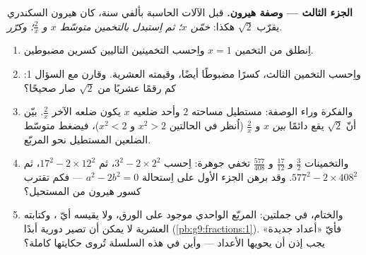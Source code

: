 \begin{problem}
\medskip
\noindent\textbf{الجزء الثالث --- وصفة هيرون.}
قبل الآلات الحاسبة بألفي سنة، كان هيرون السكندري يقرّب $\sqrt2$
هكذا: \emph{خمّن $x$؛ ثم اِستبدل بالتخمين متوسّط $x$ و $\frac2x$؛
وكرّر.}
\begin{enumerate}[resume]
  \item اِنطلق من التخمين $x = 1$ واِحسب التخمينين التاليين
        كسرين مضبوطين.
  \item واِحسب التخمين الثالث، كسرًا مضبوطًا أيضًا، وقيمته
        العشرية. وقارن مع السؤال 1: كم رقمًا عشريًا من $\sqrt2$
        صار صحيحًا؟
  \item والفكرة وراء الوصفة: مستطيل مساحته $2$ وأحد ضلعيه $x$
        يكون ضلعه الآخر $\frac2x$. بيّن أنّ $\sqrt2$ يقع دائمًا
        \emph{بين} $x$ و $\frac2x$ (اُنظر في الحالتين $x^2 > 2$
        و $x^2 < 2$)، فيضغط متوسّط الضلعين المستطيل نحو المربّع.
  \item والتخمينات $\frac32$ و $\frac{17}{12}$ و
        $\frac{577}{408}$ تخفي جوهرة: اِحسب $3^2 - 2 \times
        2^2$، ثم $17^2 - 2 \times 12^2$، ثم
        $577^2 - 2 \times 408^2$. وقد برهن الجزء الأول على
        اِستحالة $a^2 - 2b^2 = 0$ --- فكم تقترب كسور هيرون
        من المستحيل؟
  \item والختام، في جملتين:  المربّع الواحدي موجود على الورق،
        ولا يقيسه أيّ ، وكتابته العشرية لا يمكن أن تصير
        دورية أبدًا (\cref{pb:g9:fractions:1}). فأيّ «أعداد
        جديدة» يجب إذن أن يحويها  الأعداد --- وأين في هذه
        السلسلة تُروى حكايتها كاملة؟
\end{enumerate}
\end{problem}

